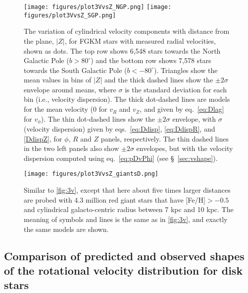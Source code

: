 \begin{figure}[!ht]
\texttt{[image: figures/plot3VvsZ\_NGP.png]}
\texttt{[image: figures/plot3VvsZ\_SGP.png]}
\caption{The variation of cylindrical velocity components with distance from the plane, $|Z|$, for FGKM stars with measured radial velocities, shown as dots. 
The top row shows 6,548 stars towards the North Galactic Pole ($b >80^\circ$) and the bottom row shows 7,578 stars towards the South Galactic Pole
($b < -80^\circ$). Triangles show the mean values in bins of $|Z|$ and the thick dashed lines show the $\pm2\sigma$ envelope around means, where
$\sigma$ is the standard deviation for each bin (i.e., velocity dispersion). The thick dot-dashed lines are models for the mean velocity (0 for $v_R$ and
$v_Z$, and given by eq.~\ref{eq:Dlag} for $v_\phi$). The thin dot-dashed lines show the $\pm2\sigma$ envelope, with $\sigma$ (velocity dispersion)
given by eqs.~\ref{eq:Ddisp}, \ref{eq:DdispR}, and \ref{DdispZ}, for $\phi$, $R$ and $Z$ panels, respectively.  The thin dashed lines in the two left panels
also show $\pm2\sigma$ envelopes, but with the velocity dispersion computed using eq.~\ref{eq:pDvPhi} (see \S~\ref{sec:vshape}).} 
\label{fig:3v} 
\end{figure}

 
\begin{figure}[!ht]
\texttt{[image: figures/plot3VvsZ\_giantsD.png]} 
\caption{Similar to \autoref{fig:3v}, except that here about five times larger distances are probed with 4.3 million red giant stars
  that have [Fe/H]$>-0.5$ and cylindrical galacto-centric radius between 7 kpc and 10 kpc. The meaning of symbols and lines
  is the same as in \autoref{fig:3v}, and exactly the same models are shown.} 
\label{fig:3vRGs} 
\end{figure}



\subsection{Comparison of predicted and observed shapes of the rotational velocity distribution for disk stars\label{sec:vshape}}

